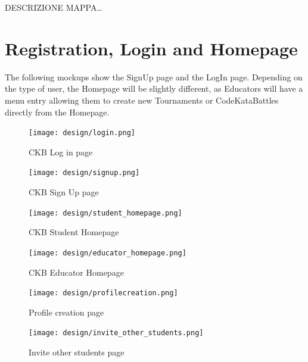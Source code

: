 DESCRIZIONE MAPPA\dots



\section{Registration, Login and Homepage}
\label{sec: registration_login_homepage}%
The following mockups show the SignUp page and the LogIn page. 
Depending on the type of user, the Homepage will be slightly different, as Educators will have a menu entry allowing them to
create new Tournaments or CodeKataBattles directly from the Homepage.

\begin{figure}[H]
    \begin{minipage}{0.45\linewidth}
        \centering
        \texttt{[image: design/login.png]}
        \caption{CKB Log in page}
        \label{fig: login}
    \end{minipage}\hfill
    \begin{minipage}{0.45\linewidth}
        \centering
        \texttt{[image: design/signup.png]}
        \caption{CKB Sign Up page}
        \label{fig: signup}
    \end{minipage}
\end{figure}

\begin{figure} [H]
    \begin{center}
        \texttt{[image: design/student\_homepage.png]}
        \caption{CKB Student Homepage}
        \label{fig: student_homepage}
    \end{center}
\end{figure}

\begin{figure} [H]
    \begin{center}
        \texttt{[image: design/educator\_homepage.png]}
        \caption{CKB Educator Homepage}
        \label{fig: educator_homepage}
    \end{center}
\end{figure}

\begin{figure} [H]
    \begin{center}
        \texttt{[image: design/profilecreation.png]}
        \caption{Profile creation page}
        \label{fig: profilecreation}
    \end{center}
\end{figure}
\begin{figure} [H]
    \begin{center}
        \texttt{[image: design/invite\_other\_students.png]}
        \caption{Invite other students page}
        \label{fig: invite_others}
    \end{center}
\end{figure}

